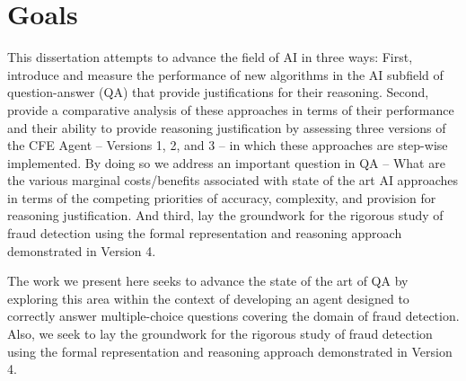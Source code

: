 \section{Goals}

This dissertation attempts to advance the field of AI in three ways:  First, introduce and measure the performance of new algorithms in the AI subfield of question-answer (QA) that provide justifications for their reasoning.  Second,  provide a comparative analysis of these approaches in terms of their performance and their ability to provide reasoning justification by assessing three versions of the CFE Agent -- Versions 1, 2, and 3 -- in which these approaches are step-wise implemented.  By doing so we address an important question in QA -- What are the various marginal costs/benefits associated with state of the art AI approaches in terms of the competing priorities of accuracy, complexity, and provision for reasoning justification. And third, lay the groundwork for the rigorous study of fraud detection using the formal representation and reasoning approach demonstrated in Version 4.  

The work we present here seeks to advance the state of the art of QA by exploring this area within the context of developing an agent designed to correctly answer multiple-choice questions covering the domain of fraud detection.   Also, we seek to lay the groundwork for the rigorous study of fraud detection using the formal representation and reasoning approach demonstrated in Version 4.  


